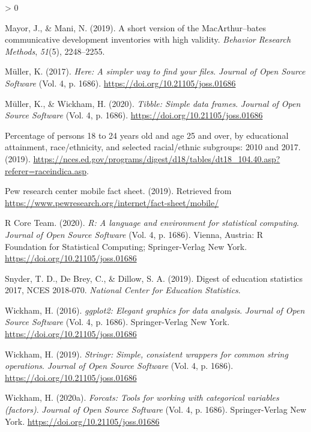 \documentclass[
  english,
  ,man,floatsintext]{apa6}
\newlength{\cslhangindent}
\newenvironment{CSLReferences}[2] %
 {%
  \setlength{\parindent}{0pt}
  \ifodd #1 \everypar{\setlength{\hangindent}{\cslhangindent}}\ignorespaces\fi
  \ifnum #2 > 0
  \setlength{\parskip}{#2\baselineskip}
  \fi
 }%
 {}
\begin{document}
\begin{CSLReferences}{1}{0}
\leavevmode\hypertarget{ref-Mayor2019}{}%
Mayor, J., \& Mani, N. (2019). A short version of the MacArthur--bates communicative development inventories with high validity. \emph{Behavior Research Methods}, \emph{51}(5), 2248--2255.

\leavevmode\hypertarget{ref-R-here}{}%
Müller, K. (2017). \emph{Here: A simpler way to find your files}. \emph{Journal of Open Source Software} (Vol. 4, p. 1686). \url{https://doi.org/10.21105/joss.01686}

\leavevmode\hypertarget{ref-R-tibble}{}%
Müller, K., \& Wickham, H. (2020). \emph{Tibble: Simple data frames}. \emph{Journal of Open Source Software} (Vol. 4, p. 1686). \url{https://doi.org/10.21105/joss.01686}

\leavevmode\hypertarget{ref-nces2019}{}%
Percentage of persons 18 to 24 years old and age 25 and over, by educational attainment, race/ethnicity, and selected racial/ethnic subgroups: 2010 and 2017. (2019). \url{https://nces.ed.gov/programs/digest/d18/tables/dt18_104.40.asp?referer=raceindica.asp}.

\leavevmode\hypertarget{ref-Center2019}{}%
Pew research center mobile fact sheet. (2019). Retrieved from \url{https://www.pewresearch.org/internet/fact-sheet/mobile/}

\leavevmode\hypertarget{ref-R-base}{}%
R Core Team. (2020). \emph{R: A language and environment for statistical computing}. \emph{Journal of Open Source Software} (Vol. 4, p. 1686). Vienna, Austria: R Foundation for Statistical Computing; Springer-Verlag New York. \url{https://doi.org/10.21105/joss.01686}

\leavevmode\hypertarget{ref-Snyder2019}{}%
Snyder, T. D., De Brey, C., \& Dillow, S. A. (2019). Digest of education statistics 2017, NCES 2018-070. \emph{National Center for Education Statistics}.

\leavevmode\hypertarget{ref-R-ggplot2}{}%
Wickham, H. (2016). \emph{ggplot2: Elegant graphics for data analysis}. \emph{Journal of Open Source Software} (Vol. 4, p. 1686). Springer-Verlag New York. \url{https://doi.org/10.21105/joss.01686}

\leavevmode\hypertarget{ref-R-stringr}{}%
Wickham, H. (2019). \emph{Stringr: Simple, consistent wrappers for common string operations}. \emph{Journal of Open Source Software} (Vol. 4, p. 1686). \url{https://doi.org/10.21105/joss.01686}

\leavevmode\hypertarget{ref-R-forcats}{}%
Wickham, H. (2020a). \emph{Forcats: Tools for working with categorical variables (factors)}. \emph{Journal of Open Source Software} (Vol. 4, p. 1686). Springer-Verlag New York. \url{https://doi.org/10.21105/joss.01686}


\end{CSLReferences}
\end{document}
